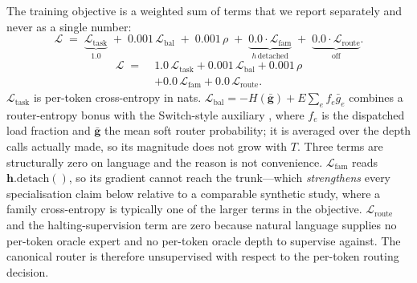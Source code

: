 The training objective is a weighted sum of terms that we report separately and
never as a single number:
{\dispsize
\begin{equation}
\mathcal{L} \;=\;
\underbrace{\mathcal{L}_{\text{task}}}_{1.0} \;+\;
0.001\,\mathcal{L}_{\text{bal}} \;+\;
0.001\,\rho \;+\;
\underbrace{0.0\cdot\mathcal{L}_{\text{fam}}}_{h\,\text{detached}} \;+\;
\underbrace{0.0\cdot\mathcal{L}_{\text{route}}}_{\text{off}} .
\label{eq:loss}
\end{equation}
}
{\dispsize
\begin{equation}
\begin{aligned}
\mathcal{L} \;=\;& 1.0\,\mathcal{L}_{\text{task}}
   + 0.001\,\mathcal{L}_{\text{bal}} + 0.001\,\rho \\
  &+ 0.0\,\mathcal{L}_{\text{fam}} + 0.0\,\mathcal{L}_{\text{route}} .
\end{aligned}
\label{eq:loss}
\end{equation}
}
$\mathcal{L}_{\text{task}}$ is per-token cross-entropy in nats.
$\mathcal{L}_{\text{bal}} = -H(\bar{\mathbf{g}}) + E\sum_e f_e \bar{g}_e$ combines
a router-entropy bonus with the Switch-style auxiliary \citep{fedus2022switch},
where $f_e$ is the dispatched load fraction and $\bar{\mathbf{g}}$ the mean soft
router probability; it is averaged over the depth calls actually made, so its
magnitude does not grow with $T$. Three terms are structurally zero on language
and the reason is not convenience. $\mathcal{L}_{\text{fam}}$ reads
$\mathbf{h}.\mathrm{detach}()$, so its gradient cannot reach the trunk---which
\emph{strengthens} every specialisation claim below relative to a comparable
synthetic study, where a family cross-entropy is typically one of the larger terms
in the objective. $\mathcal{L}_{\text{route}}$ and the halting-supervision term are
zero because natural language supplies no per-token oracle expert and no per-token
oracle depth to supervise against. The canonical router is therefore unsupervised
with respect to the per-token routing decision.

